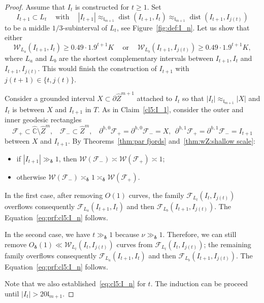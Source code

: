 \documentclass{amsart}
\renewcommand{\sp}{{\ \ }}
\newcommand{\1}{{\mathbb 1 }}
\newcommand{\Fam}{{\mathcal F}}
\newcommand{\Width}{{\mathcal W}}
\newcommand{\wZ}{{\widehat Z}}
\newcommand{\length}{{\mathfrak l}}
\newcommand{\wC}{\widehat{\mathbb{C}}}
\theoremstyle{remark}
\numberwithin{equation}{section}
\theoremstyle{definition}
\newcommand{\dist}{\operatorname{dist}}
\newcommand{\bdelta}{{\boldsymbol{ \delta}}}
\begin{document}
\begin{proof} 
Assume that $I_t$ is constructed for $t\ge 1$. Set \[I_{t+1}\subset L_t \sp\sp\text{ with }\sp\sp |I_{t+1}|\approx_{\length_{m+1}} \dist(I_{t+1}, I_t)\approx_{\length_{m+1}} \dist(I_{t+1}, I_{j(t)})\]
to be a middle $1/3$-subinterval of $L_t$, see Figure~\ref{fig:def:I_n}. Let us show that either
\begin{equation}
\label{eq:prf:cl5:I_n}
 \Width_{L_a}(I_{t+1}, I_t)\ge 0.49 \cdot 1.9^{t+1} K\sp\sp\text{ or }\sp\sp \Width_{L_b}(I_{t+1}, I_{j(t)})\ge 0.49 \cdot 1.9^{t+1} K,
\end{equation} 
 where $L_a$ and $L_b$ are the shortest complementary intervals between $I_{t+1}, I_t$ and $I_{t+1}, I_{j(t)}$. This would finish the construction of $I_{t+1}$ with $j(t+1)\in \{t, j(t)\}$.



Consider a grounded interval $X\subset \partial \wZ^{m+1}$ attached to $I_t$ so that $|I_t|\approx _{\length_{m+1}} |X|$ and $I_t$ is between $X$ and $I_{t+1}$ in $T$. As in Claim~\ref{cl5:I_1}, consider the outer and inner geodesic rectangles \[\Fam_+\subset \wC\setminus \wZ^m,\sp \sp \Fam_-\subset \wZ^m,\sp\sp \partial ^{h,0}\Fam_+=\partial ^{h,0}\Fam_- = X,\sp  \partial ^{h,1}\Fam_+=\partial ^{h,1}\Fam_- = I_{t+1}\] between $X$ and $I_{t+1}$. By Theorems~\ref{thm:par fjords} and~\ref{thm:wZ:shallow scale}:
\begin{itemize}
\item if $|I_{t+1}|\gg_{\bdelta} 1$, then $\Width(\Fam_-)\asymp \Width(\Fam_+)\asymp 1$;
\item otherwise $\Width(\Fam_-)\asymp_{\bdelta} 1\asymp_\bdelta \Width(\Fam_+)$.
\end{itemize}

In the first case,  after removing $O(1)$ curves, the family $\Fam _{L_t}(I_t, I_{j(t)})$ overflows consequently $\Fam_{L_a}(I_{t+1}, I_t)$ and then $\Fam_{L_b}(I_{t+1}, I_{j(t)})$. The Equation~\eqref{eq:prf:cl5:I_n} follows. 


In the second case, we have $t \gg_\bdelta 1$ because $\nu \gg _\bdelta 1$. Therefore, we can still remove $O_{\bdelta} (1)\ll  \Width _{L_t}(I_t, I_{j(t)})$ curves from  $\Fam _{L_t}(I_t, I_{j(t)})$; the remaining family overflows consequently $\Fam_{L_a}(I_{t+1}, I_t)$ and then $\Fam_{L_b}(I_{t+1}, I_{j(t)})$. The Equation~\eqref{eq:prf:cl5:I_n} follows. 

Note that we also established~\eqref{eq:cl5:I_n} for $t$. The induction can be proceed until $|I_t|> 20 \length_{m+1}$.


\end{proof}
\end{document}
